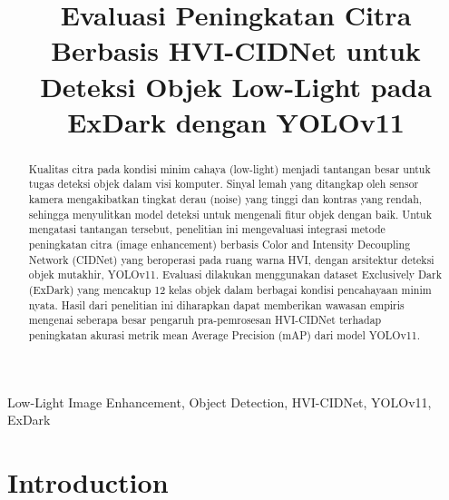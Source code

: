 \documentclass[conference]{IEEEtran}
\begin{document}
\title{Evaluasi Peningkatan Citra Berbasis HVI-CIDNet untuk Deteksi Objek Low-Light pada ExDark dengan YOLOv11}

\author{
\and
{}
}


\maketitle

\begin{abstract}
Kualitas citra pada kondisi minim cahaya (low-light) menjadi tantangan besar untuk tugas deteksi objek dalam visi komputer. Sinyal lemah yang ditangkap oleh sensor kamera mengakibatkan tingkat derau (noise) yang tinggi dan kontras yang rendah, sehingga menyulitkan model deteksi untuk mengenali fitur objek dengan baik. Untuk mengatasi tantangan tersebut, penelitian ini mengevaluasi integrasi metode peningkatan citra (image enhancement) berbasis Color and Intensity Decoupling Network (CIDNet) yang beroperasi pada ruang warna HVI, dengan arsitektur deteksi objek mutakhir, YOLOv11. Evaluasi dilakukan menggunakan dataset Exclusively Dark (ExDark) yang mencakup 12 kelas objek dalam berbagai kondisi pencahayaan minim nyata. Hasil dari penelitian ini diharapkan dapat memberikan wawasan empiris mengenai seberapa besar pengaruh pra-pemrosesan HVI-CIDNet terhadap peningkatan akurasi metrik mean Average Precision (mAP) dari model YOLOv11.
\end{abstract}

\begin{IEEEkeywords}
Low-Light Image Enhancement, Object Detection, HVI-CIDNet, YOLOv11, ExDark
\end{IEEEkeywords}

\section{Introduction}
\end{document}
